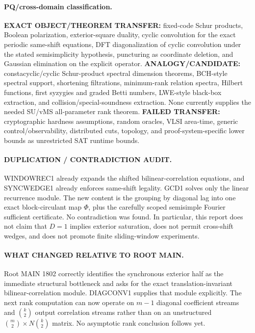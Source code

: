 \documentclass[11pt]{article}
\begin{document}
\paragraph{PQ/cross-domain classification.}
\textbf{EXACT OBJECT/THEOREM TRANSFER:} fixed-code Schur products, Boolean polarization, exterior-square duality, cyclic convolution for the exact periodic same-shift equations, DFT diagonalization of cyclic convolution under the stated semisimplicity hypothesis, puncturing as coordinate deletion, and Gaussian elimination on the explicit operator.
\textbf{ANALOGY/CANDIDATE:} constacyclic/cyclic Schur-product spectral dimension theorems, BCH-style spectral support, shortening filtrations, minimum-rank relation spectra, Hilbert functions, first syzygies and graded Betti numbers, LWE-style black-box extraction, and collision/special-soundness extraction. None currently supplies the needed SU/vMS all-parameter rank theorem.
\textbf{FAILED TRANSFER:} cryptographic hardness assumptions, random oracles, VLSI area-time, generic control/observability, distributed cuts, topology, and proof-system-specific lower bounds as unrestricted SAT runtime bounds.

\paragraph{DUPLICATION / CONTRADICTION AUDIT.}
WINDOWREC1 already expands the shifted bilinear-correlation equations, and SYNCWEDGE1 already enforces same-shift legality. GCD1 solves only the linear recurrence module. The new content is the grouping by diagonal lag into one exact block-circulant map \(\Phi\), plus the carefully scoped semisimple Fourier sufficient certificate. No contradiction was found. In particular, this report does not claim that \(D=1\) implies exterior saturation, does not permit cross-shift wedges, and does not promote finite sliding-window experiments.

\paragraph{WHAT CHANGED RELATIVE TO ROOT MAIN.}
Root MAIN 1802 correctly identifies the synchronous exterior half as the immediate structural bottleneck and asks for the exact translation-invariant bilinear-correlation module. DIAGCONV1 supplies that module explicitly. The next rank computation can now operate on \(m-1\) diagonal coefficient streams and \(\binom{k}{2}\) output correlation streams rather than on an unstructured \(\binom m2\times N\binom k2\) matrix. No asymptotic rank conclusion follows yet.
\end{document}
